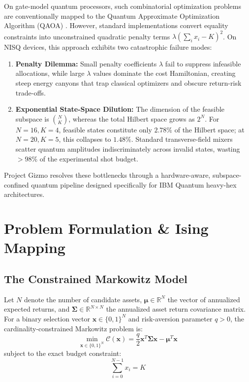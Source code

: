 \documentclass[10pt,twocolumn]{article}
\begin{document}
On gate-model quantum processors, such combinatorial optimization problems are conventionally mapped to the Quantum Approximate Optimization Algorithm (QAOA) \cite{farhi2014}. However, standard implementations convert equality constraints into unconstrained quadratic penalty terms $\lambda (\sum_{i} x_i - K)^2$. On NISQ devices, this approach exhibits two catastrophic failure modes:
\begin{enumerate}
    \item \textbf{Penalty Dilemma:} Small penalty coefficients $\lambda$ fail to suppress infeasible allocations, while large $\lambda$ values dominate the cost Hamiltonian, creating steep energy canyons that trap classical optimizers and obscure return-risk trade-offs.
    \item \textbf{Exponential State-Space Dilution:} The dimension of the feasible subspace is $\binom{N}{K}$, whereas the total Hilbert space grows as $2^N$. For $N=16, K=4$, feasible states constitute only $2.78\%$ of the Hilbert space; at $N=20, K=5$, this collapses to $1.48\%$. Standard transverse-field mixers scatter quantum amplitudes indiscriminately across invalid states, wasting $>98\%$ of the experimental shot budget.
\end{enumerate}

Project Gizmo resolves these bottlenecks through a hardware-aware, subspace-confined quantum pipeline designed specifically for IBM Quantum heavy-hex architectures.

\section{Problem Formulation \& Ising Mapping}

\subsection{The Constrained Markowitz Model}
Let $N$ denote the number of candidate assets, $\boldsymbol{\mu} \in \mathbb{R}^N$ the vector of annualized expected returns, and $\boldsymbol{\Sigma} \in \mathbb{R}^{N \times N}$ the annualized asset return covariance matrix. For a binary selection vector $\mathbf{x} \in \{0, 1\}^N$ and risk-aversion parameter $q > 0$, the cardinality-constrained Markowitz problem is:
\begin{equation}
\min_{\mathbf{x} \in \{0, 1\}^N} \mathcal{C}(\mathbf{x}) = \frac{q}{2} \mathbf{x}^T \boldsymbol{\Sigma} \mathbf{x} - \boldsymbol{\mu}^T \mathbf{x}
\end{equation}
subject to the exact budget constraint:
\begin{equation}
\sum_{i=0}^{N-1} x_i = K
\end{equation}
\end{document}
